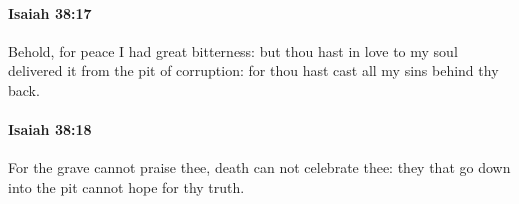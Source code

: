 		\paragraph{Isaiah 38:17} %
			\label{ISAIAH-38-17}

			Behold, for peace I had great bitterness: but thou hast in love to my soul delivered it from the pit of corruption: for thou hast cast all my sins behind thy back.


		\paragraph{Isaiah 38:18} %
			\label{ISAIAH-38-18}

			For the grave cannot praise thee, death can not celebrate thee: they that go down into the pit cannot hope for thy truth.


